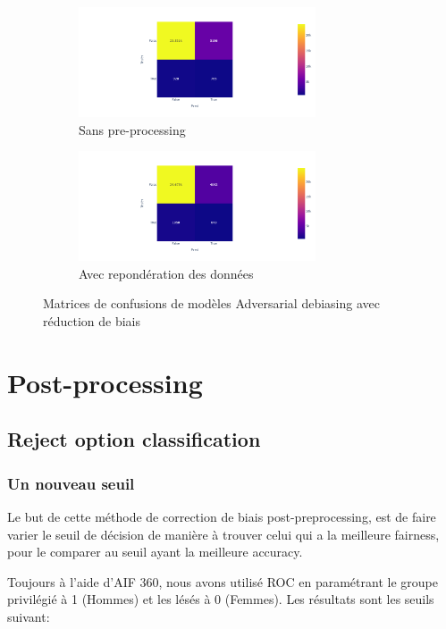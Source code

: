 \documentclass{article}
\begin{document}
    \begin{figure}[h]
        \centering
        \begin{subfigure}{7cm}
            \includegraphics[width=7cm]{./img/adversarial1_conf_matrix.png}
            \caption{Sans pre-processing}\label{fig:ADV_matrix1}
        \end{subfigure}
        \hspace{0.2cm}
        \begin{subfigure}{7cm}
            \includegraphics[width=7cm]{./img/adversarial2_conf_matrix.png}
        \caption{Avec repondération des données}\label{fig:ADV_matrix2}
        \end{subfigure}
        \caption{Matrices de confusions de modèles Adversarial debiasing avec réduction de biais}
    \end{figure}


    \section{Post-processing}

    \subsection{Reject option classification}
    \subsubsection{Un nouveau seuil}

    Le but de cette méthode de correction de biais post-preprocessing, est de faire varier le seuil de décision de manière à 
    trouver celui qui a la meilleure fairness, pour le comparer au seuil ayant la meilleure accuracy.

    Toujours à l'aide d'AIF 360, nous avons utilisé ROC en paramétrant le groupe privilégié à 1 (Hommes) et les lésés à 0 (Femmes).
    Les résultats sont les seuils suivant: 
\end{document}

